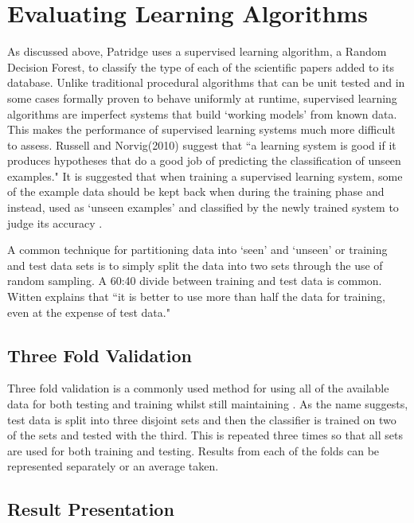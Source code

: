 \section{ Evaluating Learning Algorithms }

As discussed above, Patridge uses a supervised learning algorithm, a Random
Decision Forest, to classify the type of each of the scientific papers added to
its database. Unlike traditional procedural algorithms that can be unit tested
and in some cases formally proven to behave uniformly at
runtime\cite{filliatre2007formal}, supervised learning algorithms are imperfect
systems that build `working models' from known data. This makes the performance
of supervised learning systems much more difficult to assess. Russell and
Norvig(2010) suggest that ``a learning system is good if it produces hypotheses
that do a good job of predicting the classification of unseen
examples\cite{russell2010artificial}." It is suggested that when training a
supervised learning system, some of the example data should be kept back when
during the training phase and instead, used as `unseen examples' and classified
by the newly trained system to judge its accuracy
\cite{alpaydin2004introduction}\cite{russell2010artificial}.

A common technique for partitioning data into `seen' and `unseen' or training
and test data sets is to simply split the data into two sets through the use of
random sampling.  A 60:40 divide between training and test data is common.
Witten explains that ``it is better to use more than half the data for
training, even at the expense of test data\cite{witten2005data}." 

\subsection{ Three Fold Validation }

Three fold validation is a commonly used method for using all of the available
data for both testing and training whilst still maintaining . As the name
suggests, test data is split into three disjoint sets and then the classifier
is trained on two of the sets and tested with the third. This is repeated three
times so that all sets are used for both training and testing. Results from
each of the folds can be represented separately or an average taken.

\subsection{ Result Presentation } 


